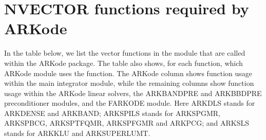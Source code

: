 \documentclass[letterpaper,10pt,english]{sphinxmanual}
\begin{document}
\section{NVECTOR functions required by ARKode}
\label{nvectors/ARKode_requirements::doc}\label{nvectors/ARKode_requirements:nvector-functions-required-by-arkode}\label{nvectors/ARKode_requirements:nvectors-arkode}
In the table below, we list the vector functions in the 
module that are called within the ARKode package.  The table also
shows, for each function, which ARKode module uses the function.
The ARKode column shows function usage within the main integrator
module,  while the remaining columns show function usage within
the ARKode linear solvers, the ARKBANDPRE and ARKBBDPRE
preconditioner modules, and the FARKODE module.  Here ARKDLS stands
for ARKDENSE and ARKBAND; ARKSPILS stands for ARKSPGMR, ARKSPBCG,
ARKSPTFQMR, ARKSPFGMR and ARKPCG; and ARKSLS stands for ARKKLU and
ARKSUPERLUMT.
\end{document}

